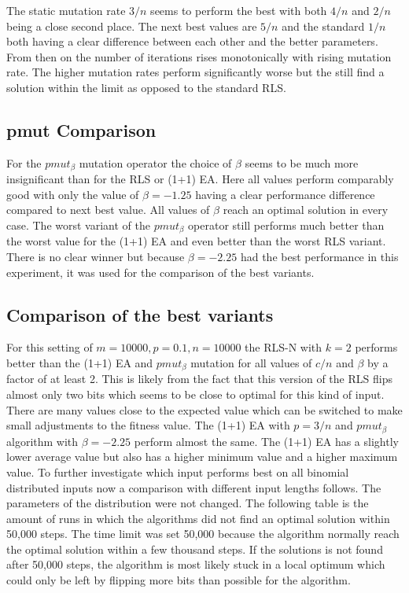 

The static mutation rate $3/n$ seems to perform the best with both $4/n$ and $2/n$ being a close second place. The next best values are $5/n$ and the standard $1/n$ both having a clear difference between each other and the better parameters. From then on the number of iterations rises monotonically with rising mutation rate. The higher mutation rates perform significantly worse but the still find a solution within the limit as opposed to the standard RLS.
\subsection{pmut Comparison}




For the $pmut_\beta$ mutation operator the choice of $\beta$ seems to be much more insignificant than for the RLS or (1+1) EA. Here all values perform comparably good with only the value of $\beta = -1.25$ having a clear performance difference compared to next best value. All values of $\beta$ reach an optimal solution in every case. The worst variant of the $pmut_\beta$ operator still performs much better than the worst value for the (1+1) EA and even better than the worst RLS variant. There is no clear winner but because $\beta=-2.25$ had the best performance in this experiment, it was used for the comparison of the best variants.
\subsection{Comparison of the best variants}




For this setting of $m=10000, p=0.1, n=10000$ the RLS-N with $k=2$ performs better than the  (1+1) EA and $pmut_\beta$ mutation for all values of $c/n$ and $\beta$ by a factor of at least 2.
This is likely from the fact that this version of the RLS flips almost only two bits which seems to be close to optimal for this kind of input.
There are many values close to the expected value which can be switched to make small adjustments to the fitness value.
The (1+1) EA with $p=3/n$ and $pmut_\beta$ algorithm with $\beta=-2.25$ perform almost the same.
The (1+1) EA has a slightly lower average value but also has a higher minimum value and a higher maximum value.
To further investigate which input performs best on all binomial distributed inputs now a comparison with different input lengths follows.
The parameters of the distribution were not changed.\newline
The following table is the amount of runs in which the algorithms did not find an optimal solution within 50,000 steps.
The time limit was set 50,000 because the algorithm normally reach the optimal solution within a few thousand steps.
If the solutions is not found after 50,000 steps, the algorithm is most likely stuck in a local optimum which could only be left by flipping more bits than possible for the algorithm.

